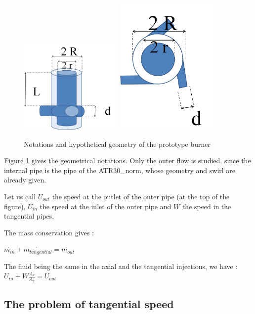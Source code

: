\begin{figure}[h!]
  \centering
\includegraphics[width=0.45\textwidth]{fig/proto.png}
\includegraphics[width=0.45\textwidth]{fig/proto_dessus.png}
  \caption{Notations and hypothetical geometry of the prototype burner}
 \label{proto}
\end{figure}
Figure \ref{proto} gives the geometrical notations. Only the outer flow is studied, since the internal pipe is the pipe of the ATR30_norm, whose geometry and swirl are already given.

Let us call $U_{out}$ the speed at the outlet of the outer pipe (at the top of the figure), $U_{in}$ the speed at the inlet of the outer pipe and $W$ the speed in the tangential pipes.

The mass conservation gives :

$\dot{m_{in}}+\dot{m_{tangential}}=\dot{m_{out}}$

The fluid being the same in the axial and the tangential injections, we have :
$U_{in}+W \frac{A_{\theta}}{A_{z}}=U_{out}$ 

\subsection{The problem of tangential speed}

